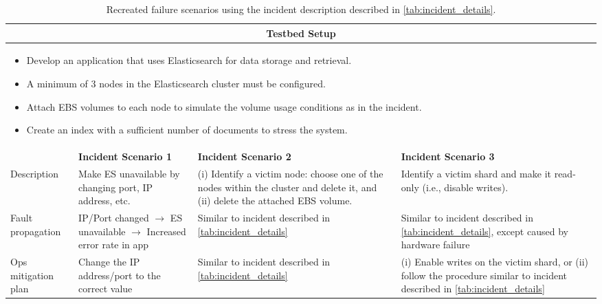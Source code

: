 \begin{table*}[t!]
    \centering
    \begin{threeparttable}
        \caption{Recreated failure scenarios using the incident description described in \cref{tab:incident_details}.}
        \label{tab:testbed_setup}
        \begin{tabularx}{\linewidth}{lXXX}
            \toprule
            \multicolumn{4}{c}{\textbf{Testbed Setup}} \\
            \midrule
            \multicolumn{4}{p{\linewidth}}{
            \begin{itemize}[left=0pt, topsep=0pt, partopsep=0pt, itemsep=0pt, parsep=0pt]
                \item Develop an application that uses Elasticsearch for data storage and retrieval.
                \item A minimum of 3 nodes in the Elasticsearch cluster must be configured.
                \item Attach EBS volumes to each node to simulate the volume usage conditions as in the incident.
                \item Create an index with a sufficient number of documents to stress the system.
            \end{itemize}
            } \\
            \midrule
             & \textbf{Incident Scenario 1} & \textbf{Incident Scenario 2} & \textbf{Incident Scenario 3} \\
            \midrule
            Description &
            Make ES unavailable by changing port, IP address, etc. &
            (i) Identify a victim node: choose one of the nodes within the cluster and delete it, and (ii) delete the attached EBS volume. &
            Identify a victim shard and make it read-only (i.e., disable writes). \\
          
            Fault propagation &
            IP/Port changed $\rightarrow$ ES unavailable $\rightarrow$ Increased error rate in app &
            Similar to incident described in \cref{tab:incident_details} &
            Similar to incident described in \cref{tab:incident_details}, except caused by hardware failure \\
      
            Ops mitigation plan &
            Change the IP address/port to the correct value &
            Similar to incident described in \cref{tab:incident_details} &
            (i) Enable writes on the victim shard, or (ii) follow the procedure similar to incident described in \cref{tab:incident_details} \\
            \bottomrule
        \end{tabularx}
    \end{threeparttable}
\end{table*}

